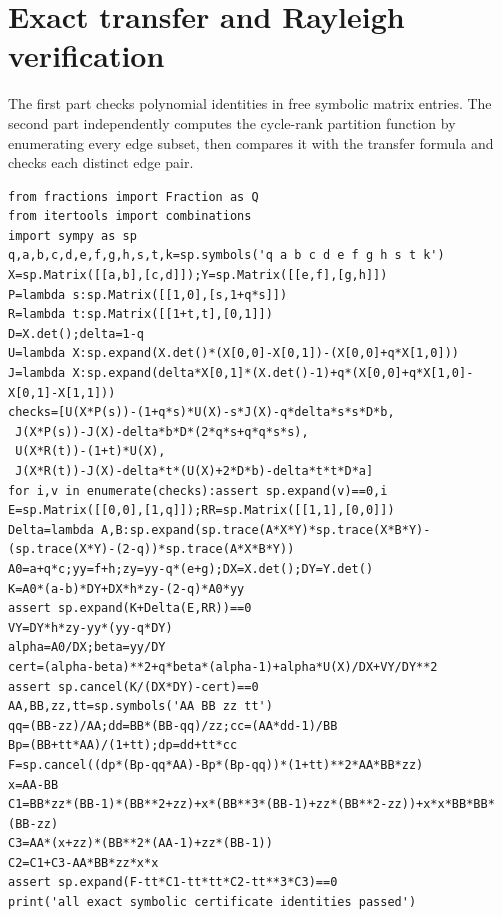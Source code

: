 \documentclass[11pt,a4paper]{article}
\theoremstyle{definition}
\theoremstyle{remark}\newtheorem{remark}[theorem]{Remark}
\begin{document}
\clearpage
\appendix
\section{Exact transfer and Rayleigh verification}
The first part checks polynomial identities in free symbolic matrix
entries. The second part independently computes the cycle-rank
partition function by enumerating every edge subset, then compares it
with the transfer formula and checks each distinct edge pair.


\begin{lstlisting}
from fractions import Fraction as Q
from itertools import combinations
import sympy as sp
q,a,b,c,d,e,f,g,h,s,t,k=sp.symbols('q a b c d e f g h s t k')
X=sp.Matrix([[a,b],[c,d]]);Y=sp.Matrix([[e,f],[g,h]])
P=lambda s:sp.Matrix([[1,0],[s,1+q*s]])
R=lambda t:sp.Matrix([[1+t,t],[0,1]])
D=X.det();delta=1-q
U=lambda X:sp.expand(X.det()*(X[0,0]-X[0,1])-(X[0,0]+q*X[1,0]))
J=lambda X:sp.expand(delta*X[0,1]*(X.det()-1)+q*(X[0,0]+q*X[1,0]-X[0,1]-X[1,1]))
checks=[U(X*P(s))-(1+q*s)*U(X)-s*J(X)-q*delta*s*s*D*b,
 J(X*P(s))-J(X)-delta*b*D*(2*q*s+q*q*s*s),
 U(X*R(t))-(1+t)*U(X),
 J(X*R(t))-J(X)-delta*t*(U(X)+2*D*b)-delta*t*t*D*a]
for i,v in enumerate(checks):assert sp.expand(v)==0,i
E=sp.Matrix([[0,0],[1,q]]);RR=sp.Matrix([[1,1],[0,0]])
Delta=lambda A,B:sp.expand(sp.trace(A*X*Y)*sp.trace(X*B*Y)-(sp.trace(X*Y)-(2-q))*sp.trace(A*X*B*Y))
A0=a+q*c;yy=f+h;zy=yy-q*(e+g);DX=X.det();DY=Y.det()
K=A0*(a-b)*DY+DX*h*zy-(2-q)*A0*yy
assert sp.expand(K+Delta(E,RR))==0
VY=DY*h*zy-yy*(yy-q*DY)
alpha=A0/DX;beta=yy/DY
cert=(alpha-beta)**2+q*beta*(alpha-1)+alpha*U(X)/DX+VY/DY**2
assert sp.cancel(K/(DX*DY)-cert)==0
AA,BB,zz,tt=sp.symbols('AA BB zz tt')
qq=(BB-zz)/AA;dd=BB*(BB-qq)/zz;cc=(AA*dd-1)/BB
Bp=(BB+tt*AA)/(1+tt);dp=dd+tt*cc
F=sp.cancel((dp*(Bp-qq*AA)-Bp*(Bp-qq))*(1+tt)**2*AA*BB*zz)
x=AA-BB
C1=BB*zz*(BB-1)*(BB**2+zz)+x*(BB**3*(BB-1)+zz*(BB**2-zz))+x*x*BB*BB*(BB-zz)
C3=AA*(x+zz)*(BB**2*(AA-1)+zz*(BB-1))
C2=C1+C3-AA*BB*zz*x*x
assert sp.expand(F-tt*C1-tt*tt*C2-tt**3*C3)==0
print('all exact symbolic certificate identities passed')


\end{lstlisting}
\end{document}
